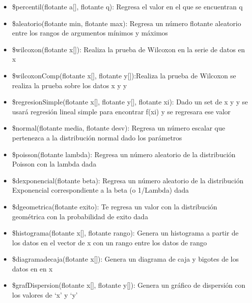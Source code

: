 \begin{itemize}
    \item  \$percentil(flotante a[], flotante q): Regresa el valor en el que se encuentran q%
    \item  \$aleatorio(flotante min, flotante max): Regresa un número flotante aleatorio entre los rangos de argumentos mínimos y máximos
    \item  \$wilcoxon(flotante x[]): Realiza la prueba de Wilcoxon en la serie de datos en x
    \item  \$wilcoxonComp(flotante x[], flotante y[]):Realiza la prueba de Wilcoxon se realiza la prueba sobre los datos x y y
    \item  \$regresionSimple(flotante x[], flotante y[], flotante xi): Dado un set de x y y se usará regresión lineal simple para encontrar f(xi) y se regresara ese valor
    \item  \$normal(flotante media, flotante desv): Regresa un número escalar que pertenezca a la distribución normal dado los parámetros
    \item  \$poisson(flotante lambda): Regresa un número aleatorio de la distribución Poisson con la lambda dada
    \item  \$dexponencial(flotante beta): Regresa un número aleatorio de la distribución Exponencial correspondiente a la beta (o 1/Lambda) dada
    \item  \$dgeometrica(flotante exito): Te regresa un valor con la distribución geométrica con la probabilidad de exito dada
    \item  \$histograma(flotante x[], flotante rango): Genera un histograma a partir de los datos en el vector de x con un rango entre los datos de rango
    \item  \$diagramadecaja(flotante x[]): Genera un diagrama de caja y bigotes de los datos en en x
    \item  \$grafDispersion(flotante x[], flotante y[]): Genera un gráfico de dispersión con los valores de ‘x’ y ‘y’

\end{itemize}
